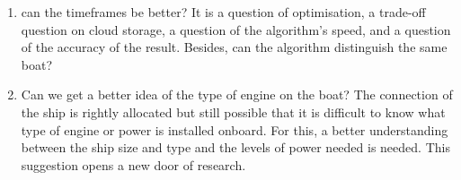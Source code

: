 \begin{enumerate}
    \item can the timeframes be better? It is a question of optimisation, a trade-off question on cloud storage, a question of the algorithm's speed, and a question of the accuracy of the result. Besides, can the algorithm distinguish the same boat?
    
    \item Can we get a better idea of the type of engine on the boat? The connection of the ship is rightly allocated but still possible that it is difficult to know what type of engine or power is installed onboard. For this, a better understanding between the ship size and type and the levels of power needed is needed. This suggestion opens a new door of research.
\end{enumerate}
 
